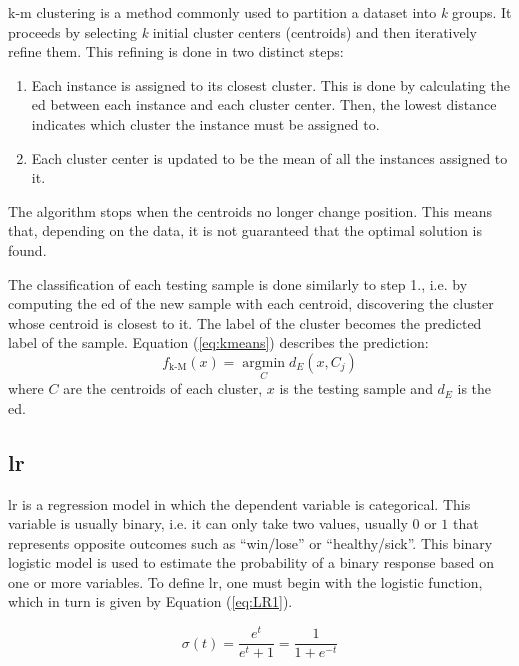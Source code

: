 \ac{k-m} clustering \cite{lloyd1982least} is a method commonly used to partition a dataset into \textit{k} groups. It proceeds by selecting \textit{k} initial cluster centers (centroids) and then iteratively refine them. This refining is done in two distinct steps:

\begin{enumerate}
    \item Each instance is assigned to its closest cluster. This is done by calculating the \ac{ed} between each instance and each cluster center. Then, the lowest distance indicates which cluster the instance must be assigned to.
    \item Each cluster center is updated to be the mean of all the instances assigned to it.
\end{enumerate}
The algorithm stops when the centroids no longer change position. This means that, depending on the data, it is not guaranteed that the optimal solution is found.

The classification of each testing sample is done similarly to step 1., i.e. by computing the \ac{ed} of the new sample with each centroid, discovering the cluster whose centroid is closest to it. The label of the cluster becomes the predicted label of the sample. Equation (\ref{eq:kmeans}) describes the prediction:
\begin{equation}
\label{eq:kmeans}
f_{\text{k-M}}(x)= \operatorname*{argmin}_C d_{E}(x,C_j)
\end{equation}
where $C$ are the centroids of each cluster, $x$ is the testing sample and $d_E$ is the \ac{ed}.

\subsection{\acl{lr}}
\label{ssec:LogisticRegression}


\ac{lr} \cite{walker1967estimation} is a regression model in which the dependent variable is categorical. This variable is usually binary, i.e. it can only take two values, usually $0$ or $1$ that represents opposite outcomes such as ``win/lose'' or ``healthy/sick''.
This binary logistic model is used to estimate the probability of a binary response based on one or more variables.
To define \ac{lr}, one must begin with the logistic function, which in turn is given by Equation (\ref{eq:LR1}).

\begin{equation}
\label{eq:LR1}
\sigma (t)={\frac {e^{t}}{e^{t}+1}}={\frac {1}{1+e^{-t}}}
\end{equation}

